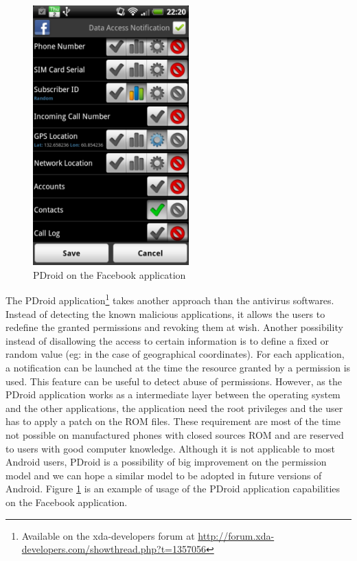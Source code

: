 \begin{figure}[h]
  \centering
  \includegraphics[width=6cm]{images/pdroid.png}
  \caption{PDroid on the Facebook application}
  \label{fig:pdroid}
\end{figure}


The PDroid application\footnote{Available on the xda-developers forum at \url{http://forum.xda-developers.com/showthread.php?t=1357056}} takes another approach than the antivirus softwares.
Instead of detecting the known malicious applications, it allows the users to redefine the granted permissions and revoking them at wish.
Another possibility instead of disallowing the access to certain information is to define a fixed or random value (eg: in the case of geographical coordinates).
For each application, a notification can be launched at the time the resource granted by a permission is used.
This feature can be useful to detect abuse of permissions.
However, as the PDroid application works as a intermediate layer between the operating system and the other applications, the application need the root privileges and the user has to apply a patch on the ROM files.
These requirement are most of the time not possible on manufactured phones with closed sources ROM and are reserved to users with good computer knowledge.
Although it is not applicable to most Android users, PDroid is a possibility of big improvement on the permission model and we can hope a similar model to be adopted in future versions of Android.
Figure \ref{fig:pdroid} is an example of usage of the PDroid application capabilities on the Facebook application.
